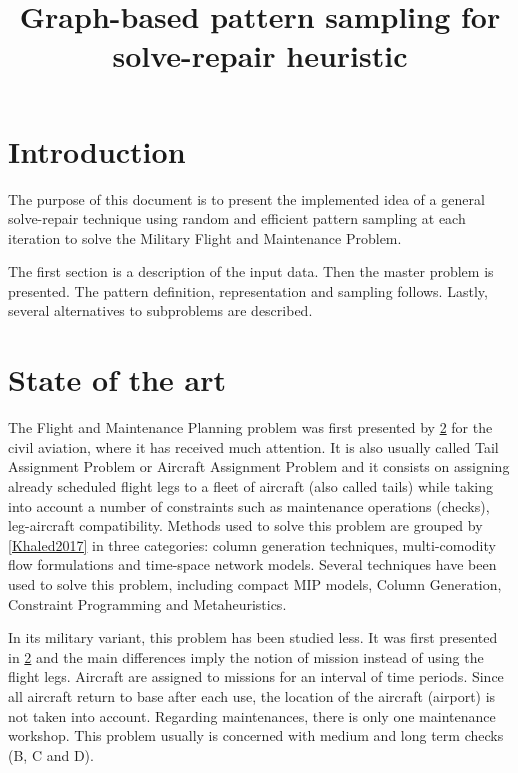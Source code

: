 \documentclass[a4paper,11pt]{article}
\title{Graph-based pattern sampling for solve-repair heuristic}
\author{}
\begin{document}
\maketitle

\section{Introduction}
  \label{sec:model}

  The purpose of this document is to present the implemented idea of a general solve-repair technique using random and efficient pattern sampling at each iteration to solve the Military Flight and Maintenance Problem.

  The first section is a description of the input data. Then the master problem is presented. The pattern definition, representation and sampling follows. Lastly, several alternatives to subproblems are described.

\section{State of the art}

  The Flight and Maintenance Planning problem was first presented by \ref{} for the civil aviation, where it has received much attention. It is also usually called Tail Assignment Problem or Aircraft Assignment Problem and it consists on assigning already scheduled flight legs to a fleet of aircraft (also called tails) while taking into account a number of constraints such as maintenance operations (checks), leg-aircraft compatibility. Methods used to solve this problem are grouped by \ref{Khaled2017} in three categories: column generation techniques, multi-comodity flow formulations and time-space network models. Several techniques have been used to solve this problem, including compact MIP models, Column Generation, Constraint Programming and Metaheuristics.

  In its military variant, this problem has been studied less. It was first presented in \ref{} and the main differences imply the notion of mission instead of using the flight legs. Aircraft are assigned to missions for an interval of time periods. Since all aircraft return to base after each use, the location of the aircraft (airport) is not taken into account. Regarding maintenances, there is only one maintenance workshop. This problem usually is concerned with medium and long term checks (B, C and D).

\end{document}
